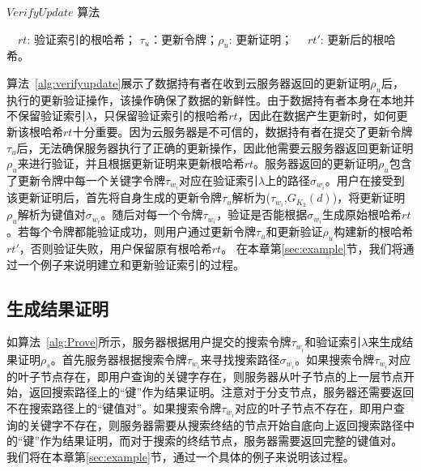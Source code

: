 \begin{algorithm}[ht]
  \caption{$VerifyUpdate$ 算法}
  \label{alg:verifyupdate}
  \begin{algorithmic}[1]
    \REQUIRE ~~{$rt$: 验证索引的根哈希； $\tau_u$：更新令牌；$\rho_u$: 更新证明；}
    \ENSURE ~~{$rt'$: 更新后的根哈希。}
                \ENDIF
              \ENDFOR
  \end{algorithmic}
\end{algorithm}

算法~\ref{alg:verifyupdate}展示了数据持有者在收到云服务器返回的更新证明$\rho_u$后，执行的更新验证操作，该操作确保了数据的新鲜性。由于数据持有者本身在本地并不保留验证索引$\lambda$，只保留验证索引的根哈希$rt$，因此在数据产生更新时，如何更新该根哈希$rt$十分重要。因为云服务器是不可信的，数据持有者在提交了更新令牌$\tau_u$后，无法确保服务器执行了正确的更新操作，因此他需要云服务器返回更新证明$\rho_u$来进行验证，并且根据更新证明来更新根哈希$rt$。服务器返回的更新证明$\rho_u$包含了更新令牌中每一个关键字令牌$\tau_{w_i}$对应在验证索引$\lambda$上的路径$\sigma_{w_i}$。用户在接受到该更新证明后，首先将自身生成的更新令牌$\tau_u$解析为($\tau_{w_i}$,$G_{K_2}(d)$)，将更新证明$\rho_u$解析为键值对$\sigma_{w_i}$。随后对每一个令牌$\tau_{w_i}$，验证是否能根据$\sigma_{w_i}$生成原始根哈希$rt$。若每个令牌都能验证成功，则用户通过更新令牌$\tau_u$和更新验证$\rho_u$构建新的根哈希$rt'$，否则验证失败，用户保留原有根哈希$rt$。
在本章第\ref{sec:example}节，我们将通过一个例子来说明建立和更新验证索引的过程。


\subsection{生成结果证明}
如算法~\ref{alg:Prove}所示，服务器根据用户提交的搜索令牌$\tau_{w_i}$和验证索引$\lambda$来生成结果证明$\rho_s$。首先服务器根据搜索令牌$\tau_{w_i}$来寻找搜索路径$\sigma_{w_i}$。如果搜索令牌$\tau_{w_i}$对应的叶子节点存在，即用户查询的关键字存在，则服务器从叶子节点的上一层节点开始，返回搜索路径上的“键”作为结果证明。注意对于分支节点，服务器还需要返回不在搜索路径上的“键值对”。如果搜索令牌$\tau_{w_i}$对应的叶子节点不存在，即用户查询的关键字不存在，则服务器需要从搜索终结的节点开始自底向上返回搜索路径中的“键”作为结果证明，而对于搜索的终结节点，服务器需要返回完整的键值对。
我们将在本章第\ref{sec:example}节，通过一个具体的例子来说明该过程。

